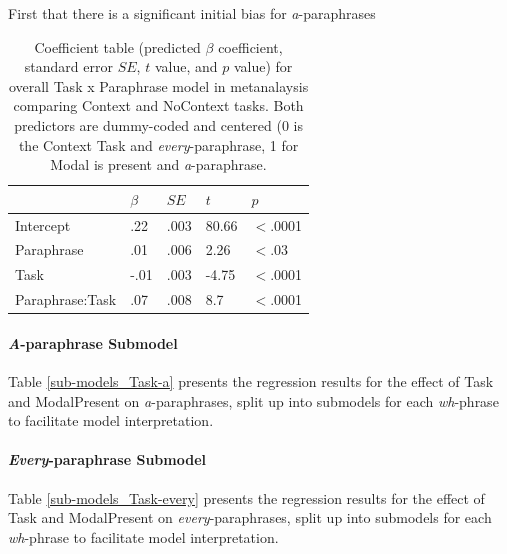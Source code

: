 \documentclass[12pt,letterpaper,table,svgnames,dvipsnames]{article}
\begin{document}
First that there is a significant initial bias for \emph{a}-paraphrases
{}
\begin{table}
\begin{center} 
\caption{Coefficient table (predicted $\beta$ coefficient, standard error $SE$, $t$ value, and $p$ value) for overall Task x Paraphrase model in metanalaysis comparing Context and NoContext tasks. Both predictors are dummy-coded and centered (0 is the Context Task and \emph{every}-paraphrase, 1 for Modal is present and \emph{a}-paraphrase.} 
\label{sub-model_Task} 
\begin{tabular}{lllll} 
\toprule
{} & $\beta$ & $SE$ & $t$ & $p$\\
\midrule
Intercept & .22 & .003 & 80.66 & $<$.0001\\
Paraphrase & .01 & .006 & 2.26 & $<$.03\\
Task & -.01 & .003 & -4.75 & $<$.0001\\
Paraphrase:Task & .07 & .008 & 8.7 & $<$.0001\\
\bottomrule
\end{tabular} 
\end{center} 
\end{table}

\paragraph{\emph{A}-paraphrase Submodel}

Table \ref{sub-models_Task-a} presents the regression results for the effect of Task and ModalPresent on \emph{a}-paraphrases, split up into submodels for each \emph{wh}-phrase to facilitate model interpretation.

\paragraph{\emph{Every}-paraphrase Submodel}

Table \ref{sub-models_Task-every} presents the regression results for the effect of Task and ModalPresent on \emph{every}-paraphrases, split up into submodels for each \emph{wh}-phrase to facilitate model interpretation.
\end{document}
